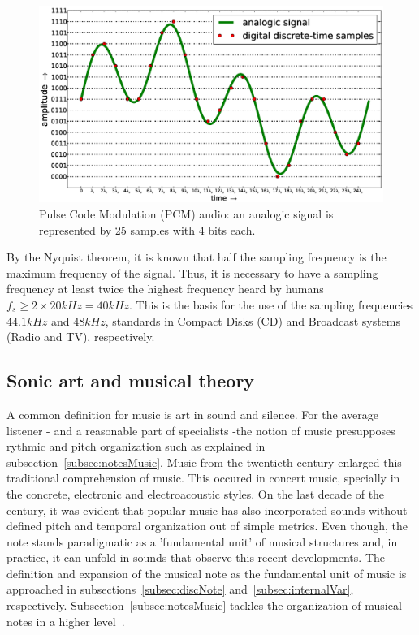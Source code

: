 \documentclass[
 aip,
 jmp,
 amsmath,amssymb,
 reprint,
]{revtex4-1}
\begin{document}
\begin{figure}
    \centering
        \includegraphics[width=\textwidth]{figures/pcm}
        \caption{Pulse Code Modulation (PCM) audio: an analogic signal is represented by 25 samples with 4 bits each.}
        \label{fig:PCM}
\end{figure}




By the Nyquist theorem, it is known that half the sampling frequency is the maximum frequency of the signal. Thus, it is necessary to have a sampling frequency at least twice the highest frequency heard by humans $f_s \geq 2\times 20kHz = 40kHz$. This is the basis for the use of the sampling frequencies $44.1kHz$ and $48kHz$, standards in Compact Disks (CD) and Broadcast systems (Radio and TV), respectively.

\subsection{Sonic art and musical theory}

A common definition for music is art in sound and silence. For the average listener - and a reasonable part of specialists -the notion of music presupposes rythmic and pitch organization such as explained in subsection~\ref{subsec:notesMusic}. Music from the twentieth century enlarged this traditional comprehension of music. This occured in concert music, specially in the concrete, electronic and electroacoustic styles. On the last decade of the century, it was evident that popular music has also incorporated sounds without defined pitch and temporal organization out of simple metrics. Even though, the note stands paradigmatic as a 'fundamental unit' of musical structures and, in practice, it can unfold in sounds that observe this recent developments. The definition and expansion of the musical note as the fundamental unit of music is approached in subsections~\ref{subsec:discNote} and~\ref{subsec:internalVar}, respectively. Subsection~\ref{subsec:notesMusic} tackles the organization of musical notes in a higher level~\cite{Wisnick,Webern,Lerdhal,Cook,Lacerda}.
\end{document}
